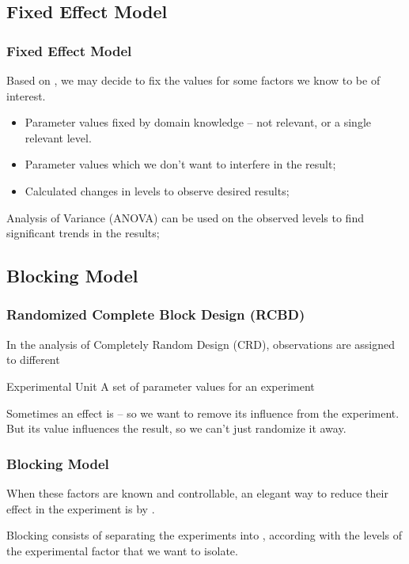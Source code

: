 \documentclass[10pt]{beamer}
\begin{document}
\subsection{Fixed Effect Model}

\begin{frame}
  \frametitle{Fixed Effect Model} 
  Based on , we may decide to fix the
  values for some factors we know to be of interest.

  \begin{itemize}
  \item {} Parameter values fixed by domain
    knowledge -- not relevant, or a single relevant level.
  \item {} Parameter values which we don't
    want to interfere in the result;
  \item {} Calculated changes in levels to
    observe desired results;
  \end{itemize}

  Analysis of Variance (ANOVA) can be used on the observed levels to
  find significant trends in the results;
\end{frame}


\subsection{Blocking Model}
\begin{frame}
  \frametitle{Randomized Complete Block Design (RCBD)} 

  In the analysis of Completely Random Design (CRD), observations are
  assigned to different 

  \begin{block}{Experimental Unit}
    A set of parameter values for an experiment
  \end{block}

  Sometimes an effect is  -- so we want to
  remove its influence from the experiment. But its value influences
  the result, so we can't just randomize it away.
\end{frame}

\begin{frame}
  \frametitle{Blocking Model} 
  {\small
  When these factors are known and controllable, an elegant way to
  reduce their effect in the experiment is by .

  Blocking consists of separating the experiments into
  , according with the levels of the experimental
  factor that we want to isolate.

  }
\end{frame}
\end{document}
